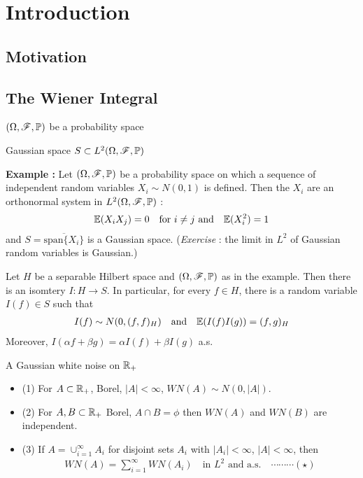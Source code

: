 \documentclass[10pt,a4paper]{article}
\renewenvironment{i}
{\begin{itemize} 
	}%
	{\end{itemize}
}
\newcommand{\doublerule}[1][.4pt]{%
  \noindent
  \makebox[0pt][l]{\rule[.7ex]{\linewidth}{#1}}%
  \rule[.3ex]{\linewidth}{#1}}
\begin{document}
\def\doubleunderline#1{\underline{\underline{#1}}}

\newcommand{\newday}{\doublerule[0.5pt]}

\setlength\parindent{0pt}

\section{Introduction}

\subsection{Motivation}

\subsection{The Wiener Integral}

$(\Omega, \mathscr{F}, \mathbb{P})$ be a probability space

 Gaussian space $S\subset L^2(\Omega, \mathscr{F}, \mathbb{P})$ 
\s

\textbf{Example :} Let $(\Omega, \mathscr{F}, \mathbb{P})$ be a probability space on which a sequence of independent random variables $X_i \sim N(0,1)$ is defined. Then the $X_i$ are an orthonormal system in $L^2(\Omega, \mathscr{F}, \mathbb{P})$ :
\begin{align*}
\mathbb{E}(X_i X_j) =0 \quad \text{for } i\neq j \text{ and} \quad \mathbb{E}(X_i^2) =1 
\end{align*}
and $S= \overline{\text{span} \{X_i\}}$ is a Gaussian space. (\textit{Exercise} : the limit in $L^2$ of Gaussian random variables is Gaussian.)
\s

\prop Let $H$ be a separable Hilbert space and $(\Omega, \mathscr{F}, \mathbb{P})$ as in the example. Then there is an isomtery $I: H\rightarrow S$. In particular, for every $f\in H$, there is a random variable $I(f) \in S$ such that
\begin{align*}
I(f) \sim N(0, (f,f)_H) \quad \text{and} \quad \mathbb{E}(I(f)I(g)) = (f,g)_H
\end{align*}
Moreover, $I(\alpha f + \beta g) = \alpha I(f) + \beta I(g)$ a.s.
\s

 A Gaussian white noise on $\mathbb{R}_+$ 
\s

\prop \begin{i}
\item[(1)] For $A\subset \mathbb{R}_+$, Borel, $|A|<\infty$, $WN(A) \sim N(0, |A|)$.
\item[(2)] For $A, B\subset \mathbb{R}_+$ Borel, $A\cap B =\phi$ then $WN(A)$ and $WN(B)$ are independent.
\item[(3)] If $A = \cup_{i=1}^{\infty} A_i$ for disjoint sets $A_i$ with $|A_i|<\infty$, $|A| <\infty$, then 
\begin{align*}
WN(A) = \sum_{i=1}^{\infty} WN(A_i)\quad \text{in } L^2 \text{ and a.s.} \quad \cdots\cdots\cdots (\star)
\end{align*}
\end{i}
\s
\end{document}
